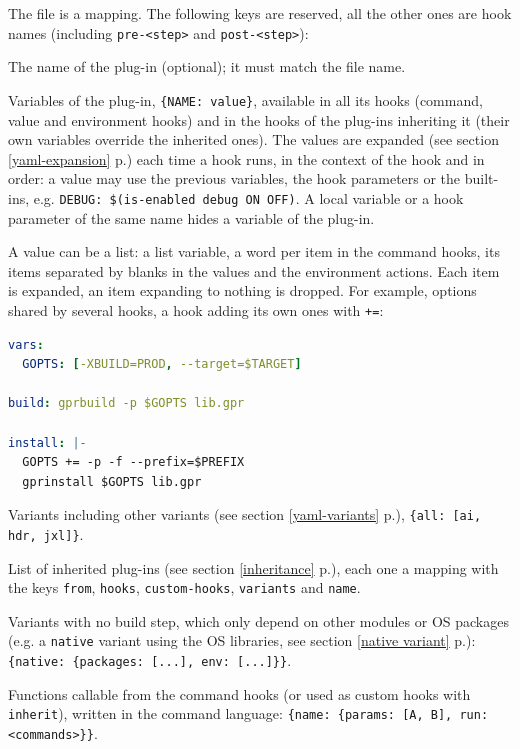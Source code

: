 \documentclass[a4paper,12pt,twoside]{article}
\newcommand{\code}[1]{\texttt{#1}}
\newcommand{\seeref}[1]{see section \ref{#1} p.\pageref{#1}}
\begin{document}
The file is a mapping. The following keys are reserved, all the other ones
are hook names (including \code{pre-<step>} and \code{post-<step>}):

\begin{description}[font=\texttt]
	\item[plugin] The name of the plug-in (optional); it must match the file name.
	\item[vars] Variables of the plug-in, \code{\{NAME: value\}}, available in all its hooks
	(command, value and environment hooks) and in the hooks of the
	plug-ins inheriting it (their own variables override the inherited
	ones). The values are expanded (\seeref{yaml-expansion}) each time a
	hook runs, in the context of the hook and in order: a value may use
	the previous variables, the hook parameters or the built-ins, e.g.
	\code{DEBUG: \$(is-enabled debug ON OFF)}. A local variable or a hook
	parameter of the same name hides a variable of the plug-in.

	A value can be a list: a list variable, a word per item in the
	command hooks, its items separated by blanks in the values and the
	environment actions. Each item is expanded, an item expanding to
	nothing is dropped. For example, options shared by several hooks, a
	hook adding its own ones with \code{+=}:

	\begin{lstlisting}[language={yaml}]
vars:
  GOPTS: [-XBUILD=PROD, --target=$TARGET]

build: gprbuild -p $GOPTS lib.gpr

install: |-
  GOPTS += -p -f --prefix=$PREFIX
  gprinstall $GOPTS lib.gpr
	\end{lstlisting}
	\item[variants] Variants including other variants
	(\seeref{yaml-variants}), \code{\{all: [ai, hdr, jxl]\}}.
	\item[inherit] List of inherited plug-ins (\seeref{inheritance}), each
	one a mapping with the keys \code{from}, \code{hooks},
	\code{custom-hooks}, \code{variants} and \code{name}.
	\item[with-variants] Variants with no build step, which only depend on
	other modules or OS packages (e.g. a \code{native} variant using the OS
	libraries, \seeref{native variant}):
	\code{\{native: \{packages: [...], env: [...]\}\}}.
	\item[functions] Functions callable from the command hooks (or used
	as custom hooks with \code{inherit}), written in the command language:
	\code{\{name: \{params: [A, B], run: <commands>\}\}}.
\end{description}
\end{document}
